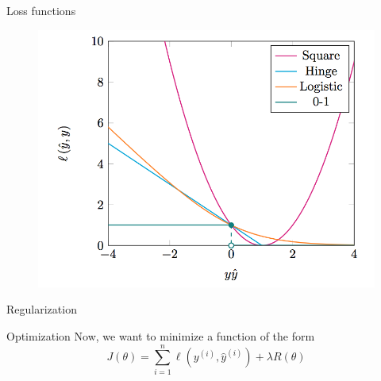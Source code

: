 \documentclass{beamer}
\newcommand{\yi}{y^{(i)}}
\newcommand{\yhati}{\hat{y}^{(i)}}
\newcommand{\1}[1]{\mathbbm{1}\left[#1\right]}
\begin{document}
\begin{frame}{Loss functions}
\begin{figure}
\includegraphics[width=\linewidth]{images/losses.png}
\end{figure}
\end{frame}

\begin{frame}{Regularization}

\end{frame}

\begin{frame}{Optimization}
Now, we want to minimize a function of the form
\begin{equation}
J(\theta) = \sum_{i = 1}^{n} \ell\left(\yi, \yhati\right) + \lambda R(\theta)
\end{equation}
\end{frame}
\end{document}
